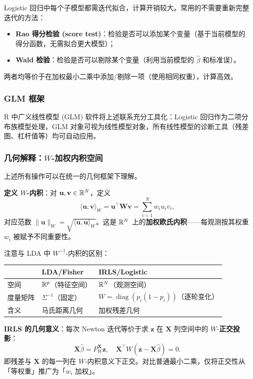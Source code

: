 Logistic 回归中每个子模型都需迭代拟合，计算开销较大。常用的不需要重新完整迭代的方法：
\begin{itemize}
    \item \textbf{Rao 得分检验 (score test)}：检验是否可以添加某个变量（基于当前模型的得分函数，无需拟合更大模型）；
    \item \textbf{Wald 检验}：检验是否可以剔除某个变量（利用当前模型的 $\hat{\beta}$ 和标准误）。
\end{itemize}
两者均等价于在加权最小二乘中添加/剔除一项（使用相同权重），计算高效。

\subsubsection{GLM 框架}

R 中广义线性模型 (GLM) 软件将上述联系充分工具化：Logistic 回归作为二项分布族模型处理，GLM 对象可视为线性模型对象，所有线性模型的诊断工具（残差图、杠杆值等）均可自动应用。

\subsubsection{几何解释：$W$-加权内积空间}

上述所有操作可以在统一的几何框架下理解。

\textbf{定义 $W$-内积}：对 $\mathbf{u}, \mathbf{v} \in \mathbb{R}^N$，定义
\[
\langle \mathbf{u}, \mathbf{v} \rangle_W = \mathbf{u}^\top \mathbf{W} \mathbf{v}
    = \sum_{i=1}^{N} w_i u_i v_i,
\]
对应范数 $\|\mathbf{u}\|_W = \sqrt{\langle \mathbf{u}, \mathbf{u} \rangle_W}$。这是 $\mathbb{R}^N$ 上的\textbf{加权欧氏内积}——每观测按其权重 $w_i$ 被赋予不同重要性。

注意与 LDA 中 $W^{-1}$-内积的区别：
\begin{center}
\begin{tabular}{lll}
\toprule
& LDA/Fisher & IRLS/Logistic \\
\midrule
空间 & $\mathbb{R}^p$（特征空间） & $\mathbb{R}^N$（观测空间） \\
度量矩阵 & $\Sigma^{-1}$（固定） & $W = \operatorname{diag}(p_i(1-p_i))$（逐轮变化） \\
含义 & 马氏距离几何 & 加权残差几何 \\
\bottomrule
\end{tabular}
\end{center}

\textbf{IRLS 的几何意义}：每次 Newton 迭代等价于求 $\mathbf{z}$ 在 $\mathbf{X}$ 列空间中的 $W$-\textbf{正交投影}：
\[
\boxed{\mathbf{X}\hat{\beta} = P_W^{\mathbf{X}} \mathbf{z}, \quad
\mathbf{X}^\top W (\mathbf{z} - \mathbf{X}\hat{\beta}) = 0.}
\]
即残差与 $\mathbf{X}$ 的每一列在 $W$-内积意义下正交。对比普通最小二乘，仅将正交性从「等权重」推广为「$w_i$ 加权」。

